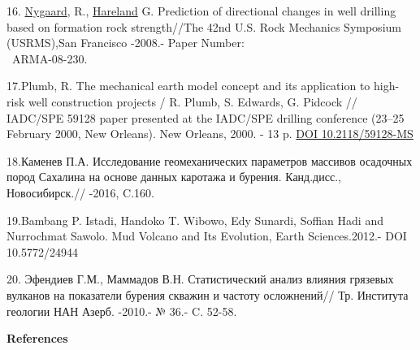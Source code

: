 \begin{references}
16. \href{javascript:;}{Nygaard}, R., \href{javascript:;}{Hareland} G.
Prediction of directional changes in well drilling based on formation
rock strength//The 42nd U.S. Rock Mechanics Symposium (USRMS),San
Francisco -2008.- Paper Number:\\~ARMA-08-230.

17.Plumb, R. The mechanical earth model concept and its application to
high-risk well construction projects / R. Plumb, S. Edwards, G. Pidcock
// IADC/SPE 59128 paper presented at the IADC/SPE drilling conference
(23--25 February 2000, New Orleans). New Orleans, 2000. - 13 p.
\href{https://doi.org/10.2118/59128-MS}{DOI 10.2118/59128-MS}

18.Каменев П.А. Исследование геомеханических параметров массивов
осадочных пород Сахалина на основе данных каротажа и бурения.
Канд.дисс., Новосибирск.// -2016, C.160.

19.Bambang P. Istadi, Handoko T. Wibowo, Edy Sunardi, Soffian Hadi and
Nurrochmat Sawolo. Mud Volcano and Its Evolution, Earth Sciences.2012.-
DOI 10.5772/24944

20. Эфендиев Г.М., Маммадов В.Н. Статистический анализ влияния грязевых
вулканов на показатели бурения скважин и частоту осложнений// Тр.
Института геологии НАН Азерб. -2010.- № 36.- C. 52-58.
\end{references}

\begin{center}
{\bfseries References}
\end{center}


